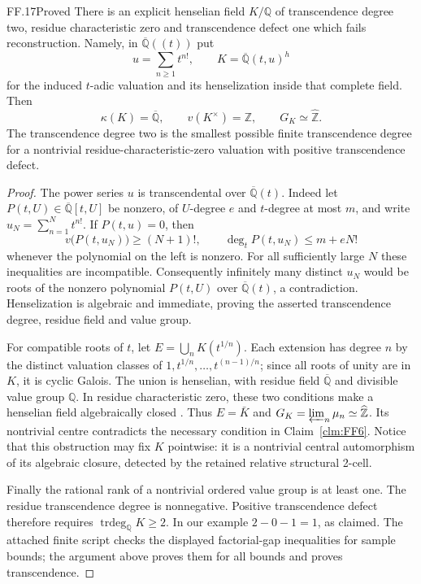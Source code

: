 \begin{claim}{FF.17}{Proved}\label{clm:FFdefect}
There is an explicit henselian field \(K/\mathbb Q\) of
transcendence degree two, residue characteristic zero and
transcendence defect one which fails reconstruction. Namely, in
\(\overline{\mathbb Q}((t))\) put
\[
 u=\sum_{n\geq1}t^{n!},\qquad
 K=\overline{\mathbb Q}(t,u)^h
\]
for the induced \(t\)-adic valuation and its henselization
inside that complete field. Then
\[
 \kappa(K)=\overline{\mathbb Q},\qquad
 v(K^\times)=\mathbb Z,\qquad G_K\simeq\widehat{\mathbb Z}.
\tag{FF.17.1}
\]
The transcendence degree two is the smallest possible finite
transcendence degree for a nontrivial residue-characteristic-zero
valuation with positive transcendence defect.
\end{claim}
\begin{proof}
The power series \(u\) is transcendental over
\(\overline{\mathbb Q}(t)\). Indeed let
\(P(t,U)\in\overline{\mathbb Q}[t,U]\) be nonzero, of
\(U\)-degree \(e\) and \(t\)-degree at most \(m\), and
write \(u_N=\sum_{n=1}^N t^{n!}\). If \(P(t,u)=0\), then
\[
 v\bigl(P(t,u_N)\bigr)\geq(N+1)!,\qquad
 \deg_tP(t,u_N)\leq m+eN!
\]
whenever the polynomial on the left is nonzero. For all
sufficiently large \(N\) these inequalities are incompatible.
Consequently infinitely many distinct \(u_N\) would be roots
of the nonzero polynomial \(P(t,U)\) over
\(\overline{\mathbb Q}(t)\), a contradiction.
Henselization is algebraic and immediate, proving the asserted
transcendence degree, residue field and value group.

For compatible roots of \(t\), let
\(E=\bigcup_n K(t^{1/n})\). Each extension has degree \(n\)
by the distinct valuation classes of
\(1,t^{1/n},\ldots,t^{(n-1)/n}\); since all roots of unity
are in \(K\), it is cyclic Galois. The union is henselian,
with residue field \(\overline{\mathbb Q}\) and divisible
value group \(\mathbb Q\). In residue characteristic zero,
these two conditions make a henselian field algebraically closed
\citep[Corollary~3.3.22]{FF_ADH2017}. Thus \(E=\bar K\)
and \(G_K=\varprojlim_n\mu_n\simeq\widehat{\mathbb Z}\).
Its nontrivial centre contradicts the necessary condition in
Claim~\ref{clm:FF6}. Notice that this obstruction may fix \(K\)
pointwise: it is a nontrivial central automorphism of its algebraic
closure, detected by the retained relative structural 2-cell.

Finally the rational rank of a nontrivial ordered value group
is at least one. The residue transcendence degree is nonnegative.
Positive transcendence defect therefore requires
\(\operatorname{trdeg}_{\mathbb Q}K\geq2\). In our example
\(2-0-1=1\), as claimed. The attached finite script checks
the displayed factorial-gap inequalities for sample bounds; the
argument above proves them for all bounds and proves transcendence.
\end{proof}

